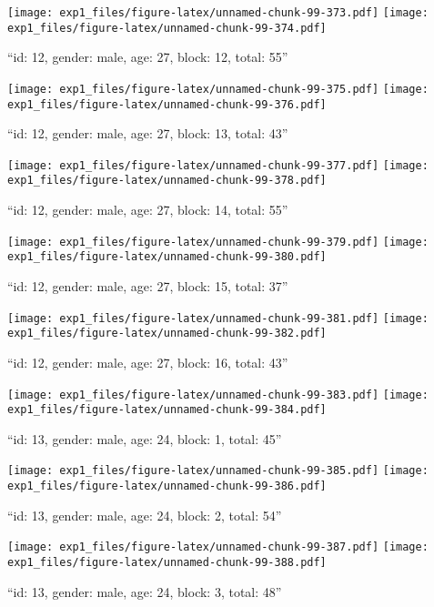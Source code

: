 \documentclass[,]{article}
\begin{document}
\texttt{[image: exp1\_files/figure-latex/unnamed-chunk-99-373.pdf]}
\texttt{[image: exp1\_files/figure-latex/unnamed-chunk-99-374.pdf]}

\newpage
[1] 

``id: 12, gender: male, age: 27, block: 12, total: 55''

\texttt{[image: exp1\_files/figure-latex/unnamed-chunk-99-375.pdf]}
\texttt{[image: exp1\_files/figure-latex/unnamed-chunk-99-376.pdf]}

\newpage
[1] 

``id: 12, gender: male, age: 27, block: 13, total: 43''

\texttt{[image: exp1\_files/figure-latex/unnamed-chunk-99-377.pdf]}
\texttt{[image: exp1\_files/figure-latex/unnamed-chunk-99-378.pdf]}

\newpage
[1] 

``id: 12, gender: male, age: 27, block: 14, total: 55''

\texttt{[image: exp1\_files/figure-latex/unnamed-chunk-99-379.pdf]}
\texttt{[image: exp1\_files/figure-latex/unnamed-chunk-99-380.pdf]}

\newpage
[1] 

``id: 12, gender: male, age: 27, block: 15, total: 37''

\texttt{[image: exp1\_files/figure-latex/unnamed-chunk-99-381.pdf]}
\texttt{[image: exp1\_files/figure-latex/unnamed-chunk-99-382.pdf]}

\newpage
[1] 

``id: 12, gender: male, age: 27, block: 16, total: 43''

\texttt{[image: exp1\_files/figure-latex/unnamed-chunk-99-383.pdf]}
\texttt{[image: exp1\_files/figure-latex/unnamed-chunk-99-384.pdf]}

\newpage
[1] 

``id: 13, gender: male, age: 24, block: 1, total: 45''

\texttt{[image: exp1\_files/figure-latex/unnamed-chunk-99-385.pdf]}
\texttt{[image: exp1\_files/figure-latex/unnamed-chunk-99-386.pdf]}

\newpage
[1] 

``id: 13, gender: male, age: 24, block: 2, total: 54''

\texttt{[image: exp1\_files/figure-latex/unnamed-chunk-99-387.pdf]}
\texttt{[image: exp1\_files/figure-latex/unnamed-chunk-99-388.pdf]}

\newpage
[1] 

``id: 13, gender: male, age: 24, block: 3, total: 48''
\end{document}
